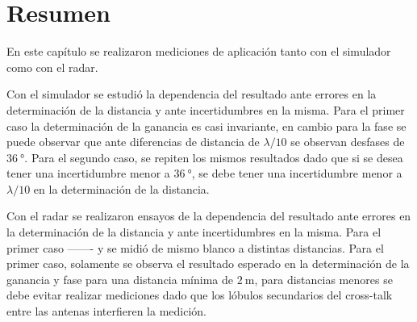 \section{Resumen}

En este capítulo se realizaron mediciones de aplicación tanto con el simulador como con el radar.

Con el simulador se estudió la dependencia del resultado ante errores en la determinación de la distancia y ante incertidumbres en la misma. Para el primer caso la determinación de la ganancia es casi invariante, en cambio para la fase se puede observar que ante diferencias de distancia de $\lambda / 10$ se observan desfases de $\SI{36}{\degree}$. Para el segundo caso, se repiten los mismos resultados dado que si se desea tener una incertidumbre menor a $\SI{36}{\degree}$, se debe tener una incertidumbre menor a $\lambda / 10$ en la determinación de la distancia.

Con el radar se realizaron ensayos de la dependencia del resultado ante errores en la determinación de la distancia y ante incertidumbres en la misma. Para el primer caso ------- y se midió de mismo blanco a distintas distancias. Para el primer caso, solamente se observa el resultado esperado en la determinación de la ganancia y fase para una distancia mínima de $\SI{2}{\meter}$, para distancias menores se debe evitar realizar mediciones dado que los lóbulos secundarios del cross-talk entre las antenas interfieren la medición.
